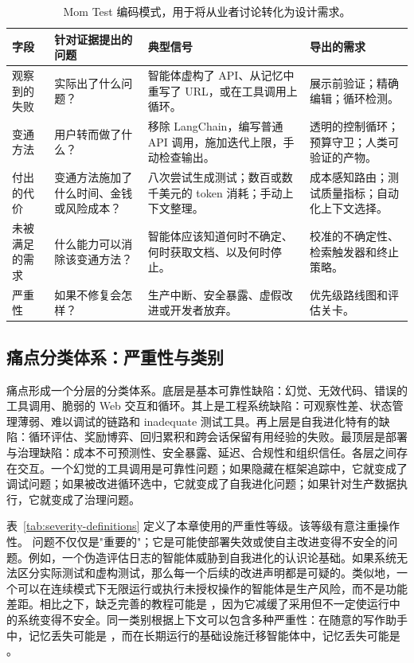 \begin{table}[t]
\centering
\TableTight
\caption{Mom Test 编码模式，用于将从业者讨论转化为设计需求。}
\label{tab:mom-test-schema}
\begin{tabularx}{\textwidth}{@{}L{0.16\textwidth}L{0.25\textwidth}L{0.27\textwidth}Y@{}}
\toprule
\textbf{字段} & \textbf{针对证据提出的问题} & \textbf{典型信号} & \textbf{导出的需求} \\
\midrule
观察到的失败 & 实际出了什么问题？ & 智能体虚构了 API、从记忆中重写了 URL，或在工具调用上循环。 & 展示前验证；精确编辑；循环检测。 \\
变通方法 & 用户转而做了什么？ & 移除 LangChain，编写普通 API 调用，施加迭代上限，手动检查输出。 & 透明的控制循环；预算守卫；人类可验证的产物。 \\
付出的代价 & 变通方法施加了什么时间、金钱或风险成本？ & 八次尝试生成测试；数百或数千美元的 token 消耗；手动上下文整理。 & 成本感知路由；测试质量指标；自动化上下文选择。 \\
未被满足的需求 & 什么能力可以消除该变通方法？ & 智能体应该知道何时不确定、何时获取文档、以及何时停止。 & 校准的不确定性、检索触发器和终止策略。 \\
严重性 & 如果不修复会怎样？ & 生产中断、安全暴露、虚假改进或开发者放弃。 & 优先级路线图和评估关卡。 \\
\bottomrule
\end{tabularx}
\end{table}

\subsection{痛点分类体系：严重性与类别}
\label{subsec:pain-taxonomy}

痛点形成一个分层的分类体系。底层是基本可靠性缺陷：幻觉、无效代码、错误的工具调用、脆弱的 Web 交互和循环。其上是工程系统缺陷：可观察性差、状态管理薄弱、难以调试的链路和 inadequate 测试工具。再上层是自我进化特有的缺陷：循环评估、奖励博弈、回归累积和跨会话保留有用经验的失败。最顶层是部署与治理缺陷：成本不可预测性、安全暴露、延迟、合规性和组织信任。各层之间存在交互。一个幻觉的工具调用是可靠性问题；如果隐藏在框架追踪中，它就变成了调试问题；如果被改进循环选中，它就变成了自我进化问题；如果针对生产数据执行，它就变成了治理问题。

表~\ref{tab:severity-definitions} 定义了本章使用的严重性等级。该等级有意注重操作性。\sevcritical{} 问题不仅仅是"重要的"；它是可能使部署失效或使自主改进变得不安全的问题。例如，一个伪造评估日志的智能体威胁到自我进化的认识论基础。如果系统无法区分实际测试和虚构测试，那么每一个后续的改进声明都是可疑的。类似地，一个可以在连续模式下无限运行或执行未授权操作的智能体是生产风险，而不是功能差距。相比之下，缺乏完善的教程可能是 \sevmedium{}，因为它减缓了采用但不一定使运行中的系统变得不安全。同一类别根据上下文可以包含多种严重性：在随意的写作助手中，记忆丢失可能是 \sevmedium{}，而在长期运行的基础设施迁移智能体中，记忆丢失可能是 \sevcritical{}。

